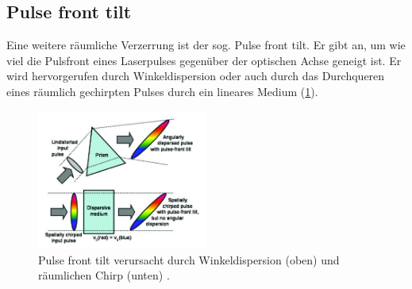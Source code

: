 \documentclass[twoside,        %
               BCOR12mm,       %
               english,ngerman, %
               fleqn,headsepline=false,footsepline=false
              ]{Vorlage/MFPREPORT}
\begin{document}
\subsection{Pulse front tilt}
Eine weitere räumliche Verzerrung ist der sog. Pulse front tilt. Er gibt an, um
wie viel die Pulsfront eines Laserpulses gegenüber der optischen Achse geneigt
ist. Er wird hervorgerufen durch Winkeldispersion oder auch durch das
Durchqueren eines räumlich gechirpten Pulses durch ein lineares Medium
(\cref{fig:pft}).
\begin{figure}[]
    \centering
    \includegraphics[width=0.5\textwidth]{pft.jpeg}
    \caption{Pulse front tilt verursacht durch Winkeldispersion (oben) und
        räumlichen Chirp (unten) \cite{Akturk:04}.}
    \label{fig:pft}
\end{figure}
\end{document}
